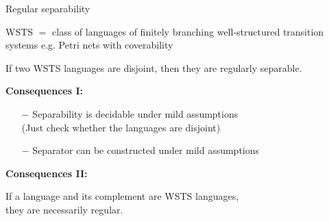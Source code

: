 \documentclass[../talk.tex]{subfiles}
\begin{document}
\begin{frame}{Regular separability}
    \begin{overlayarea}{\slidewidth}{\slideheight}
        WSTS $=$ class of languages of finitely branching well-structured transition systems
            e.g. Petri nets with coverability

            \begin{theorem}
                If two WSTS languages are \alert{disjoint}, then they are \alert{regularly separable}.
            \end{theorem}

        {%
            \textbf{Consequences I:}

            \begin{itemize}
                \item[$-$] Separability is \alert{decidable} under mild assumptions\\
                    (Just check whether the languages are disjoint)
                \item[$-$] Separator can be \alert{constructed} under mild assumptions
            \end{itemize}
        }

        {%
            \textbf{Consequences II:}

                \begin{corollary}
                    If a language and its complement are WSTS languages,\\
                    they are \alert{necessarily regular}.
                \end{corollary}

                \vspace*{-2em}
                \begin{center}
                \end{center}

}
\end{overlayarea}
\end{frame}
\end{document}
